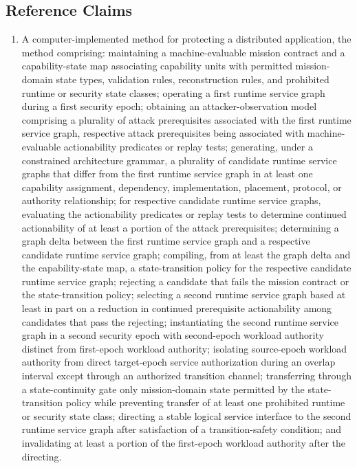 \documentclass[11pt,letterpaper]{article}
\begin{document}
\subsection{Reference Claims}

\begin{enumerate}[leftmargin=2em,itemsep=3pt,label=\arabic*.]
\item A computer-implemented method for protecting a distributed application, the method comprising: maintaining a machine-evaluable mission contract and a capability-state map associating capability units with permitted mission-domain state types, validation rules, reconstruction rules, and prohibited runtime or security state classes; operating a first runtime service graph during a first security epoch; obtaining an attacker-observation model comprising a plurality of attack prerequisites associated with the first runtime service graph, respective attack prerequisites being associated with machine-evaluable actionability predicates or replay tests; generating, under a constrained architecture grammar, a plurality of candidate runtime service graphs that differ from the first runtime service graph in at least one capability assignment, dependency, implementation, placement, protocol, or authority relationship; for respective candidate runtime service graphs, evaluating the actionability predicates or replay tests to determine continued actionability of at least a portion of the attack prerequisites; determining a graph delta between the first runtime service graph and a respective candidate runtime service graph; compiling, from at least the graph delta and the capability-state map, a state-transition policy for the respective candidate runtime service graph; rejecting a candidate that fails the mission contract or the state-transition policy; selecting a second runtime service graph based at least in part on a reduction in continued prerequisite actionability among candidates that pass the rejecting; instantiating the second runtime service graph in a second security epoch with second-epoch workload authority distinct from first-epoch workload authority; isolating source-epoch workload authority from direct target-epoch service authorization during an overlap interval except through an authorized transition channel; transferring through a state-continuity gate only mission-domain state permitted by the state-transition policy while preventing transfer of at least one prohibited runtime or security state class; directing a stable logical service interface to the second runtime service graph after satisfaction of a transition-safety condition; and invalidating at least a portion of the first-epoch workload authority after the directing.

\end{enumerate}
\end{document}
